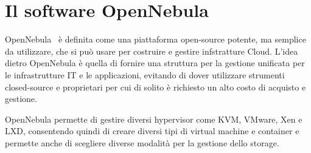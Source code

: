 \section{Il software OpenNebula}
OpenNebula~\cite{opennebula} è definita come una piattaforma open-source potente, ma semplice da utilizzare, che si può usare per costruire e gestire infstratture Cloud. L'idea dietro OpenNebula è quella di fornire una struttura per la gestione unificata per le infrastrutture IT e le applicazioni, evitando di dover utilizzare strumenti closed-source e proprietari per cui di solito è richiesto un alto costo di acquisto e gestione.\par
OpenNebula permette di gestire diversi hypervisor come KVM, VMware, Xen e LXD, consentendo quindi di creare diversi tipi di virtual machine e container e permette anche di scegliere diverse modalità per la gestione dello storage.
